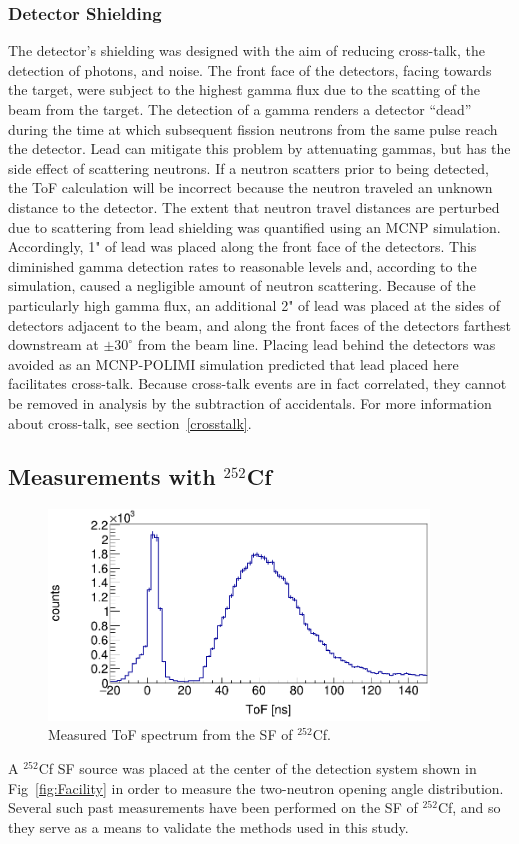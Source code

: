 \subsubsection{Detector Shielding}
The detector's shielding was designed with the aim of reducing cross-talk, the detection of photons, and noise.
The front face of the detectors, facing towards the target, were subject to the highest gamma flux due to the scatting of the beam from the target.
The detection of a gamma renders a detector ``dead'' during the time at which subsequent fission neutrons from the same pulse reach the detector.
Lead can mitigate this problem by attenuating gammas, but has the side effect of scattering neutrons.
If a neutron scatters prior to being detected, the ToF calculation will be incorrect because the neutron traveled an unknown distance to the detector.
The extent that neutron travel distances are perturbed due to scattering from lead shielding was quantified using an MCNP simulation.
Accordingly, 1" of lead was placed along the front face of the detectors.
This diminished gamma detection rates to reasonable levels and, according to the simulation, caused a negligible amount of neutron scattering.
Because of the particularly high gamma flux, an additional 2" of lead was placed at the sides of detectors adjacent to the beam, and along the front faces of the detectors farthest downstream at $\pm30^{\circ}$ from the beam line.
Placing lead behind the detectors was avoided as an MCNP-POLIMI simulation predicted that lead placed here facilitates cross-talk.
Because cross-talk events are in fact correlated, they cannot be removed in analysis by the subtraction of accidentals.
For more information about cross-talk, see section~\ref{crosstalk}.

\subsection{Measurements with $^{252}$Cf}
\begin{figure}[h]
\includegraphics[width=0.9\textwidth]{Content/Methods/Cf252ToF.png}
\caption{Measured ToF spectrum from the SF of $^{252}$Cf.}
\label{fig:Cf252ToF}
\end{figure}
A $^{252}$Cf SF source was placed at the center of the detection system shown in Fig~\ref{fig:Facility} in order to measure the two-neutron opening angle distribution.
Several such past measurements have been performed on the SF of $^{252}$Cf, and so they serve as a means to validate the methods used in this study.

